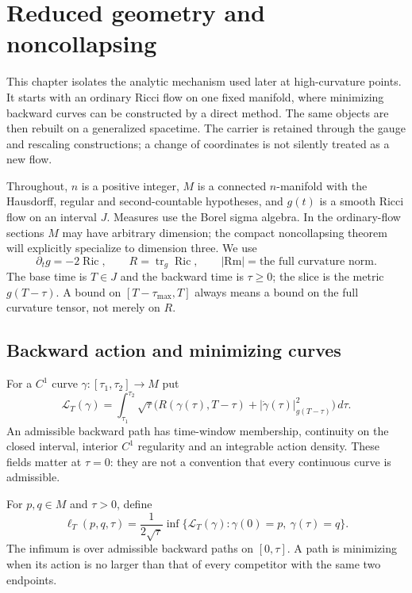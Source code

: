 \chapter{Reduced geometry and noncollapsing}
\label{ch:reduced-geometry}

This chapter isolates the analytic mechanism used later at high-curvature
points.  It starts with an ordinary Ricci flow on one fixed manifold, where
minimizing backward curves can be constructed by a direct method.  The same
objects are then rebuilt on a generalized spacetime.  The carrier is retained
through the gauge and rescaling constructions; a change of coordinates is not
silently treated as a new flow.

Throughout, $n$ is a positive integer, $M$ is a connected $n$-manifold with
the Hausdorff, regular and second-countable hypotheses, and $g(t)$ is a smooth
Ricci flow on an interval $J$.  Measures use the Borel sigma algebra.  In the
ordinary-flow sections $M$ may have arbitrary dimension; the compact
noncollapsing theorem will explicitly specialize to dimension three.  We use
\[
  \partial_tg=-2\operatorname{Ric},\qquad R=\operatorname{tr}_g\operatorname{Ric},
  \qquad |\mathrm{Rm}|=\text{the full curvature norm}.
\]
The base time is $T\in J$ and the backward time is $\tau\geq0$; the slice is
the metric $g(T-\tau)$.  A bound on $[T-\tau_{\max},T]$ always means a bound on
the full curvature tensor, not merely on $R$.

\section{Backward action and minimizing curves}

For a $C^1$ curve $\gamma:[\tau_1,\tau_2]\to M$ put
\[
 \mathcal L_{T}(\gamma)=\int_{\tau_1}^{\tau_2}
 \sqrt{\tau}\bigl(R(\gamma(\tau),T-\tau)
       +|\dot\gamma(\tau)|_{g(T-\tau)}^2\bigr)\,d\tau .
\]
An admissible backward path has time-window membership, continuity on the
closed interval, interior $C^1$ regularity and an integrable action density.  These
fields matter at $\tau=0$: they are not a convention that every continuous curve
is admissible.

\begin{definition}
\label{def:reduced-length}
For $p,q\in M$ and $\tau>0$, define
\[
 \ell_T(p,q,\tau)=\frac1{2\sqrt\tau}
   \inf\{\mathcal L_T(\gamma):\gamma(0)=p,\ \gamma(\tau)=q\}.
\]
The infimum is over admissible backward paths on $[0,\tau]$.  A path is minimizing
when its action is no larger than that of every competitor with the same two
endpoints.
\end{definition}


